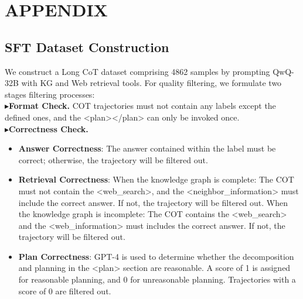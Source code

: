\documentclass[sigconf]{acmart}
\begin{document}

\balance



\appendix

\section{APPENDIX}
\subsection{SFT Dataset Construction}
\label{app:data_construct}
We construct a Long CoT dataset comprising 4862 samples by prompting QwQ-32B with KG and Web retrieval tools. For quality filtering, we formulate two stages filtering processes:\\
\noindent $\blacktriangleright$\textbf{Format Check.} COT trajectories must not contain any labels except the defined ones, and the <plan></plan> can only be invoked once.\\
\noindent $\blacktriangleright$\textbf{Correctness Check.}
\begin{itemize}[itemsep=0.5ex, leftmargin=3mm]
\item \textbf{Answer Correctness}: The answer contained within the label must be correct; otherwise, the trajectory will be filtered out.
\item \textbf{Retrieval Correctness}: When the knowledge graph is complete: The COT must not contain the <web\_search>, and the <neighbor\_information> must include the correct answer. If not, the trajectory will be filtered out. When the knowledge graph is incomplete: The COT contains the <web\_search> and the <web\_information>  must includes the correct answer. If not, the trajectory will be filtered out.
\item \textbf{Plan Correctness}: GPT-4 is used to determine whether the decomposition and planning in the <plan> section are reasonable. A score of 1 is assigned for reasonable planning, and 0 for unreasonable planning. Trajectories with a score of 0 are filtered out.
\end{itemize}

\end{document}
